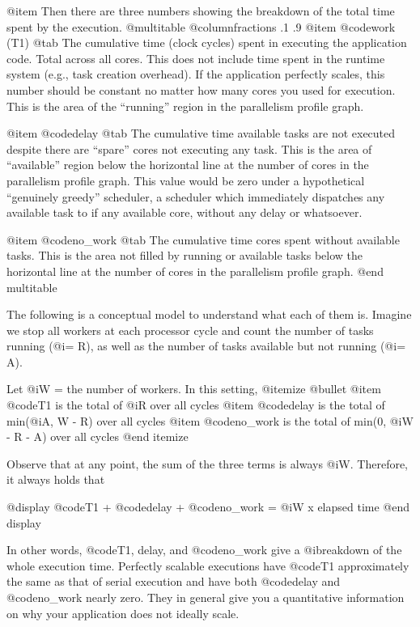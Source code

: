 @item Then there are three numbers showing the breakdown of the total 
time spent by the execution.
@multitable @columnfractions .1 .9
@item @code{work (T1)} @tab The cumulative time (clock cycles) spent
in executing the application code.  Total across all cores.  This does
not include time spent in the runtime system (e.g., task creation
overhead).  If the application perfectly scales, this number should be
constant no matter how many cores you used for execution.  This is the
area of the ``running'' region in the parallelism profile graph.

@item @code{delay} @tab The cumulative time available tasks are not
executed despite there are ``spare'' cores not executing any task.  This
is the area of ``available'' region below the horizontal line at the
number of cores in the parallelism profile graph.  This value would be
zero under a hypothetical ``genuinely greedy'' scheduler, a scheduler
which immediately dispatches any available task to if any available
core, without any delay or whatsoever.

@item @code{no_work} @tab The cumulative time cores spent without available
tasks.  This is the area not filled by running or available tasks below
the horizontal line at the number of cores in the parallelism profile
graph.
@end multitable

The following is a conceptual model to understand what each of them is.
Imagine we stop all workers at each processor cycle and count the number
of tasks running (@i{= R}), as well as the number of tasks available but
not running (@i{= A}).

Let @i{W =} the number of workers.  In this setting,
@itemize @bullet
@item @code{T1} is the total of @i{R} over all cycles
@item @code{delay} is the total of min(@i{A, W - R}) over all cycles
@item @code{no_work} is the total of min(0, @i{W - R - A}) over all cycles
@end itemize

Observe that at any point, the sum of the three terms is always @i{W}.
Therefore, it always holds that 

@display
@code{T1} + @code{delay} + @code{no_work} = @i{W} x elapsed time
@end display

In other words, @code{T1, delay}, and @code{no_work} give a
@i{breakdown} of the whole execution time.  Perfectly scalable
executions have @code{T1} approximately the same as that of serial
execution and have both @code{delay} and @code{no_work} nearly zero.
They in general give you a quantitative information on why your
application does not ideally scale.

